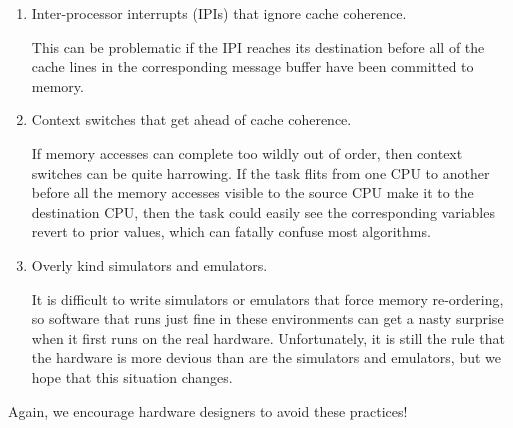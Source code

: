 \begin{enumerate}
\item	Inter-processor interrupts (IPIs) that ignore cache coherence.

	This can be problematic if the IPI reaches its destination
	before all of the cache lines in the corresponding message
	buffer have been committed to memory.

\item	Context switches that get ahead of cache coherence.

	If memory accesses can complete too wildly out of order,
	then context switches can be quite harrowing.
	If the task flits from one CPU to another before all the
	memory accesses visible to the source CPU make it to the
	destination CPU, then the task could easily see the corresponding
	variables revert to prior values, which can fatally confuse
	most algorithms.

\item	Overly kind simulators and emulators.

	It is difficult to write simulators or emulators that force
	memory re-ordering, so software that runs just fine in
	these environments can get a nasty surprise when it first
	runs on the real hardware.
	Unfortunately, it is still the rule that the hardware is more
	devious than are the simulators and emulators, but we hope that
	this situation changes.
\end{enumerate}

Again, we encourage hardware designers to avoid these practices!

